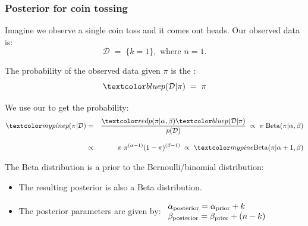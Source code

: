 \begin{frame}
\frametitle{Posterior for coin tossing}

Imagine we observe a single coin toss and it comes out heads. Our observed data is:
\[
\mathcal{D}\;=\;\{k=1\},\text{\ \ \ \ where\ \ \ \ }n=1.
\]

The probability of the observed data given $\pi$ is the :
\[
\Blue{p(\mathcal{D}|\pi)}\;=\;\pi
\]

We use our    
to get the  probability:
\begin{eqnarray*}
\PineGreen{p(\pi|\mathcal{D})}&=&\frac{\Red{p(\pi|\alpha,\beta)}
\Blue{p(\mathcal{D}|\pi)}}{p(\mathcal{D})}\;\propto\;\pi \; \mathrm{Beta} (\pi|\alpha,\beta) \\[2ex]
& \propto& \pi \; \pi^{(\alpha-1)} (1-\pi)^{(\beta-1)} 
\;\propto\;\PineGreen{\mathrm{Beta}(\pi|\alpha+1,\beta)}
\end{eqnarray*}

The Beta distribution is a  prior to the
Bernoulli/binomial distribution:
\begin{itemize}
\item The resulting posterior is also a Beta distribution.
\item The posterior parameters are given by: 
$\begin{array}{l}\alpha_{\rm posterior}=\alpha_{\rm prior}+k\\ 
\beta_{\rm posterior}=\beta_{\rm prior}+(n-k)\end{array}$
\end{itemize}

\end{frame}


